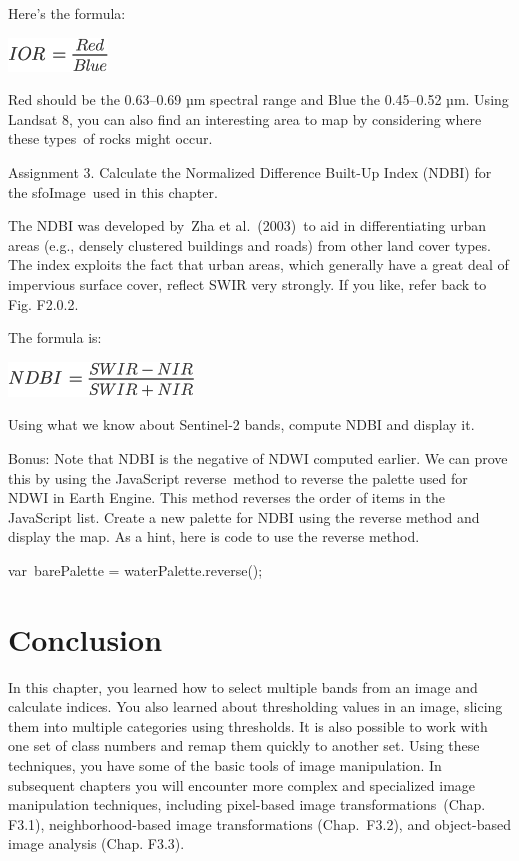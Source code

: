 \documentclass[
  letterpaper,
  DIV=11,
  numbers=noendperiod]{scrreprt}
\begin{document}
Here's the formula:

\includegraphics{./F2/image4.png}

Red should be the 0.63--0.69 µm spectral range and Blue the 0.45--0.52
µm. Using Landsat 8, you can also find an interesting area to map by
considering where these types~of rocks might occur.

Assignment 3. Calculate the Normalized Difference Built-Up Index (NDBI)
for the sfoImage~used in this chapter.

The NDBI was developed by~Zha et al.~(2003)~to aid in differentiating
urban areas (e.g., densely clustered buildings and roads) from other
land cover types. The index exploits the fact that urban areas, which
generally have a great deal of impervious surface cover, reflect SWIR
very strongly. If you like, refer back to Fig. F2.0.2.

The formula is:

\includegraphics{./F2/image5.png}

Using what we know about Sentinel-2 bands, compute NDBI and display it.

Bonus: Note that NDBI is the negative of NDWI computed earlier. We can
prove this by using the JavaScript reverse~method to reverse the palette
used for NDWI in Earth Engine. This method reverses the order of items
in the JavaScript list. Create a new palette for NDBI using the reverse
method and display the map. As a hint, here is code to use the reverse
method.

var~barePalette = waterPalette.reverse();

\hypertarget{conclusion-4}{%
\section*{Conclusion}\label{conclusion-4}}


In this chapter, you learned how to select multiple bands from an image
and calculate indices. You also learned about thresholding values in an
image, slicing them into multiple categories using thresholds. It is
also possible to work with one set of class numbers and remap them
quickly to another set. Using these techniques, you have some of the
basic tools of image manipulation. In subsequent chapters you will
encounter more complex and specialized image manipulation techniques,
including pixel-based image transformations~(Chap. F3.1),
neighborhood-based image transformations (Chap.~F3.2), and object-based
image analysis (Chap. F3.3).
\end{document}

